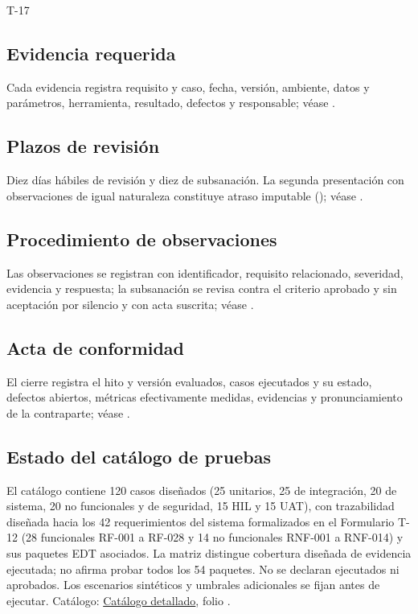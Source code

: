 \begin{formulario}{T-17}
\subsection*{Evidencia requerida}

Cada evidencia registra requisito y caso, fecha, versión, ambiente, datos y parámetros, herramienta, resultado, defectos y responsable; véase .

\subsection*{Plazos de revisión}

Diez días hábiles de revisión y diez de subsanación. La segunda presentación con observaciones de igual naturaleza constituye atraso imputable (); véase .

\subsection*{Procedimiento de observaciones}

Las observaciones se registran con identificador, requisito relacionado, severidad, evidencia y respuesta; la subsanación se revisa contra el criterio aprobado y sin aceptación por silencio y con acta suscrita; véase .

\subsection*{Acta de conformidad}

El cierre registra el hito y versión evaluados, casos ejecutados y su estado, defectos abiertos, métricas efectivamente medidas, evidencias y pronunciamiento de la contraparte; véase .

\subsection*{Estado del catálogo de pruebas}

El catálogo contiene 120 casos diseñados (25 unitarios, 25 de integración, 20 de sistema, 20 no funcionales y de seguridad, 15 HIL y 15 UAT), con trazabilidad diseñada hacia los 42 requerimientos del sistema formalizados en el Formulario T-12 (28 funcionales RF-001 a RF-028 y 14 no funcionales RNF-001 a RNF-014) y sus paquetes EDT asociados. La matriz distingue cobertura diseñada de evidencia ejecutada; no afirma probar todos los 54 paquetes. No se declaran ejecutados ni aprobados. Los escenarios sintéticos y umbrales adicionales se fijan antes de ejecutar. Catálogo: \hyperref[sec:9-catalogo]{Catálogo detallado}, folio \pageref{sec:9-catalogo}.


\end{formulario}
